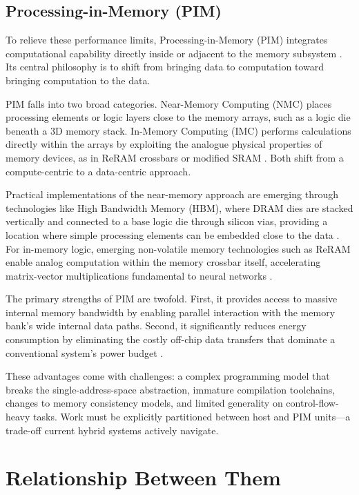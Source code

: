 \documentclass{article} %
\begin{document}
\subsection{Processing-in-Memory (PIM)}
\label{sec:pim}

To relieve these performance limits, Processing-in-Memory (PIM) integrates computational capability directly inside or adjacent to the memory subsystem \citep{sebastian2020memory,mutlu2021primer}. Its central philosophy is to shift from bringing data to computation toward bringing computation to the data.

PIM falls into two broad categories. Near-Memory Computing (NMC) places processing elements or logic layers close to the memory arrays, such as a logic die beneath a 3D memory stack. In-Memory Computing (IMC) performs calculations directly within the arrays by exploiting the analogue physical properties of memory devices, as in ReRAM crossbars or modified SRAM \citep{ielmini2018inmemory}. Both shift from a compute-centric to a data-centric approach.

Practical implementations of the near-memory approach are emerging through technologies like High Bandwidth Memory (HBM), where DRAM dies are stacked vertically and connected to a base logic die through silicon vias, providing a location where simple processing elements can be embedded close to the data \citep{kwon2021hbmpim}. For in-memory logic, emerging non-volatile memory technologies such as ReRAM enable analog computation within the memory crossbar itself, accelerating matrix-vector multiplications fundamental to neural networks \citep{chi2016prime,shafiee2016isaac}.

The primary strengths of PIM are twofold. First, it provides access to massive internal memory bandwidth by enabling parallel interaction with the memory bank's wide internal data paths. Second, it significantly reduces energy consumption by eliminating the costly off-chip data transfers that dominate a conventional system's power budget \citep{horowitz2014energy}.

These advantages come with challenges: a complex programming model that breaks the single-address-space abstraction, immature compilation toolchains, changes to memory consistency models, and limited generality on control-flow-heavy tasks. Work must be explicitly partitioned between host and PIM units---a trade-off current hybrid systems actively navigate.

\section{Relationship Between Them}
\label{sec:rel}
\end{document}

